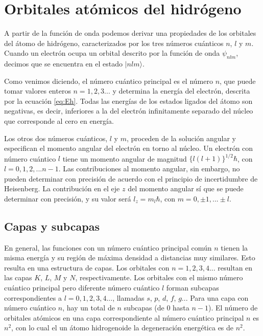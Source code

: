 \documentclass{tufte-handout}
\begin{document}
\section{Orbitales atómicos del hidrógeno}
A partir de la función de onda podemos derivar una 
propiedades de los orbitales del átomo de hidrógeno, 
caracterizados por los tres números cuánticos $n$, $l$ y
$m$. Cuando un electrón ocupa un orbital descrito por la
función de onda $\psi_{nlm}$, decimos que se
encuentra en el estado $|nlm\rangle$.

Como venimos diciendo, el número cuántico principal
es el número $n$, que puede tomar valores enteros $n=1,2,3...$
y determina la energía del electrón, descrita por la ecuación \ref{eq:Eh}.
Todas las energías de los estados ligados del átomo son negativas,
es decir, inferiores a la del electrón infinitamente separado
del núcleo que corresponde al cero en energía.

Los otros dos números cuánticos, $l$ y $m$, proceden de la solución
angular y especifican el momento angular del electrón en torno al 
núcleo. Un electrón con número cuántico $l$ tiene un momento angular
de magnitud $\{l(l+1)\}^{1/2}\hbar$, con $l=0,1,2,...n-1$. 
Las contribuciones al momento angular, sin embargo, no pueden
determinar con precisión de acuerdo con el principio de
incertidumbre de Heisenberg. La contribución en el eje $z$ del 
momento angular sí que se puede determinar con precisión, y su valor 
será $l_z=m_l\hbar$, con $m=0,\pm 1,...\pm l$.

\subsection{Capas y subcapas}
En general, las funciones con un número cuántico principal común $n$
tienen la misma energía y su región de máxima densidad a distancias
muy similares. Esto resulta en una estructura de capas. Los orbitales
con $n=1,2,3,4...$ resultan en las capas $K$, $L$, $M$ y $N$, respectivamente.
Los orbitales con el mismo número cuántico principal pero diferente 
número cuántico $l$ forman subcapas correspondientes a $l=0,1,2,3,4...$,
llamadas $s$, $p$, $d$, $f$, $g$... Para una capa con número cuántico 
$n$, hay un total de $n$ subcapas (de 0 hasta $n-1$). El número de 
orbitales atómicos en una capa correspondiente al número cuántico 
principal $n$ es $n^2$, con lo cual el un átomo hidrogenoide
la degeneración energética es de $n^2$.
\end{document}
